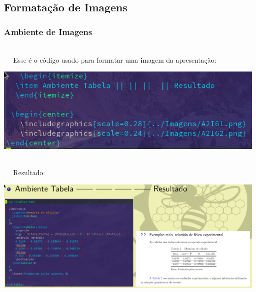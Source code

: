 \documentclass{beamer}
\begin{document}
	\begin{frame}
	  \section{Formatação de  Imagens}
	  \frametitle{Ambiente de Imagens}
	  \\~~
	  Esse é o código usado para formatar uma imagem da apresentação:
	   \begin{center}
	   \includegraphics[scale=0.30]{../Imagens/A2I91.png}
	 \end{center}
	 \\~~
	 Resultado:
	 \begin{center}
	   \includegraphics[scale=0.23]{../Imagens/A2I92.png}
	\end{center}
	\end{frame}
\end{document}

